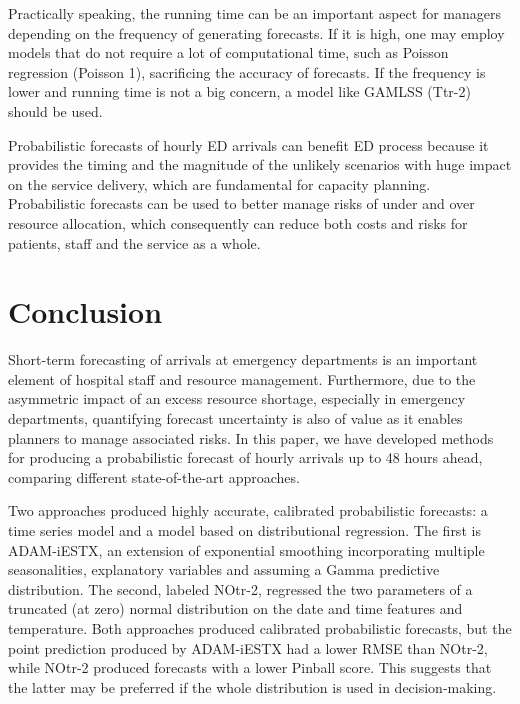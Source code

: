 \documentclass[]{elsarticle} %
\begin{document}
Practically speaking, the running time can be an important aspect for managers depending
on the frequency of generating forecasts. If it is high, one may employ models that do not
require a lot of computational time, such as Poisson regression (Poisson 1), sacrificing the
accuracy of forecasts. If the frequency is lower and running time is not a big concern, a model
like GAMLSS (Ttr-2) should be used.

Probabilistic forecasts of hourly ED arrivals can benefit ED process because it provides the timing and the magnitude of the unlikely scenarios with huge impact on the service delivery, which are fundamental for capacity planning. Probabilistic forecasts can be used to better manage risks of under and over resource allocation, which consequently can reduce both costs and risks for patients, staff and the service as a whole.

\hypertarget{conclusion}{%
\section{Conclusion}\label{conclusion}}

Short-term forecasting of arrivals at emergency departments is an
important element of hospital staff and resource management.
Furthermore, due to the asymmetric impact of an excess resource
shortage, especially in emergency departments, quantifying forecast
uncertainty is also of value as it enables planners to manage associated
risks. In this paper, we have developed methods for producing a
probabilistic forecast of hourly arrivals up to 48 hours ahead,
comparing different state-of-the-art approaches.

Two approaches produced highly accurate, calibrated probabilistic
forecasts: a time series model and a model based on distributional
regression. The first is ADAM-iESTX, an extension of exponential
smoothing incorporating multiple seasonalities, explanatory variables
and assuming a Gamma predictive distribution. The second, labeled
NOtr-2, regressed the two parameters of a truncated (at zero) normal
distribution on the date and time features and temperature. Both
approaches produced calibrated probabilistic forecasts, but the point
prediction produced by ADAM-iESTX had a lower RMSE than NOtr-2, while
NOtr-2 produced forecasts with a lower Pinball score. This suggests that
the latter may be preferred if the whole distribution is used in
decision-making.
\end{document}

